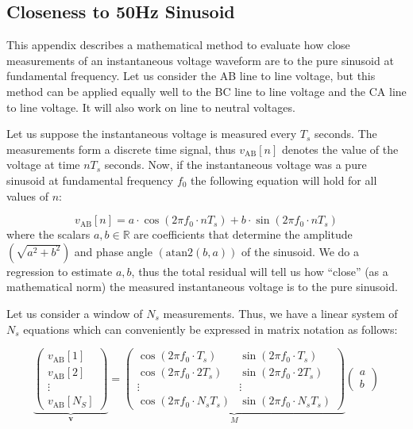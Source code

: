 \documentclass[11pt,a4paper,]{article}
\begin{document}
\begin{appendices}
\section{Closeness to 50Hz Sinusoid}
This appendix describes a mathematical method to evaluate how close measurements of an instantaneous voltage waveform are to the pure sinusoid at fundamental frequency. Let us consider the AB line to line voltage, but this method can be applied equally well to the BC line to line voltage and the CA line to line voltage. It will also work on line to neutral voltages.

Let us suppose the instantaneous voltage is measured every $T_s$ seconds. The measurements form a discrete time signal, thus $v_\text{AB}[n]$ denotes the value of the voltage at time $nT_s$ seconds. Now, if the instantaneous voltage was a pure sinusoid at fundamental frequency $f_0$ the following equation will hold for all values of $n$:

$$
v_\text{AB}[n] = a\cdot\cos\left(2\pi f_0\cdot nT_s\right) + b\cdot\sin\left(2\pi f_0\cdot nT_s\right)
$$
where the scalars $a,b\in\mathbb{R}$ are coefficients that determine the amplitude $\left(\sqrt{a^2+b^2}\right)$ and phase angle $\left(\mathrm{atan2}(b,a)\right)$ of the sinusoid. We do a regression to estimate $a,b$, thus the total residual will tell us how ``close'' (as a mathematical norm) the measured instantaneous voltage is to the pure sinusoid.

Let us consider a window of $N_s$ measurements. Thus, we have a linear system of $N_s$ equations which can conveniently be expressed in matrix notation as follows:

$$
\underbrace{
\begin{pmatrix}
v_{\text{AB}}[1] \\
v_{\text{AB}}[2] \\
\vdots \\
v_{\text{AB}}[N_S]
\end{pmatrix}}_{\bm{v}}
=
\underbrace{\begin{pmatrix}
\cos\left(2\pi f_0\cdot T_s\right) & \sin\left(2\pi f_0\cdot T_s\right) \\
\cos\left(2\pi f_0\cdot 2T_s\right) & \sin\left(2\pi f_0\cdot 2T_s\right) \\
\vdots & \vdots \\
\cos\left(2\pi f_0\cdot N_sT_s\right) & \sin\left(2\pi f_0\cdot N_sT_s\right)
\end{pmatrix}}_M
\begin{pmatrix}
a \\ b
\end{pmatrix}
$$


\end{appendices}
\end{document}
